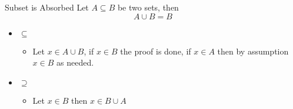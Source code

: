 \documentclass{standalone}
\begin{document}
\begin{prop*}{Subset is Absorbed}
  Let $ A \subseteq B$ be two sets, then
  \[
  A \cup  B = B
  \]
  \begin{pf}
    \begin{itemize}
      \item $ \subseteq $ 
      \begin{itemize}
        \item Let $ x \in A \cup  B$, if $ x \in B$ the proof is done, if $ x \in A$ then by assumption $ x \in B$ as needed.
      \end{itemize}
      \item $ \supseteq $ 
        \begin{itemize}
          \item Let $ x \in B$ then $ x \in B \cup A$ 
        \end{itemize}
    \end{itemize}
  \end{pf}
\end{prop*}
\end{document}

